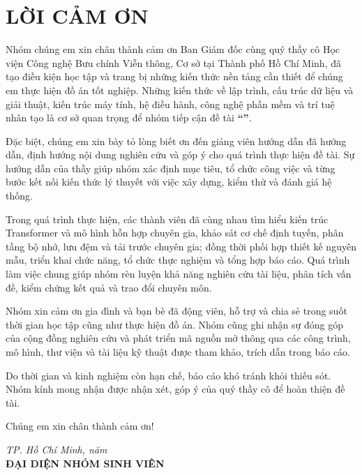 \chapter*{LỜI CẢM ƠN}

Nhóm chúng em xin chân thành cảm ơn Ban Giám đốc cùng quý thầy cô Học viện Công nghệ Bưu chính Viễn thông, Cơ sở tại Thành phố Hồ Chí Minh, đã tạo điều kiện học tập và trang bị những kiến thức nền tảng cần thiết để chúng em thực hiện đồ án tốt nghiệp. Những kiến thức về lập trình, cấu trúc dữ liệu và giải thuật, kiến trúc máy tính, hệ điều hành, công nghệ phần mềm và trí tuệ nhân tạo là cơ sở quan trọng để nhóm tiếp cận đề tài \textbf{``\reporttitle''}.

Đặc biệt, chúng em xin bày tỏ lòng biết ơn đến giảng viên hướng dẫn \textbf{\reportsupervisor} đã hướng dẫn, định hướng nội dung nghiên cứu và góp ý cho quá trình thực hiện đề tài. Sự hướng dẫn của thầy giúp nhóm xác định mục tiêu, tổ chức công việc và từng bước kết nối kiến thức lý thuyết với việc xây dựng, kiểm thử và đánh giá hệ thống.

Trong quá trình thực hiện, các thành viên đã cùng nhau tìm hiểu kiến trúc Transformer và mô hình hỗn hợp chuyên gia, khảo sát cơ chế định tuyến, phân tầng bộ nhớ, lưu đệm và tải trước chuyên gia; đồng thời phối hợp thiết kế nguyên mẫu, triển khai chức năng, tổ chức thực nghiệm và tổng hợp báo cáo. Quá trình làm việc chung giúp nhóm rèn luyện khả năng nghiên cứu tài liệu, phân tích vấn đề, kiểm chứng kết quả và trao đổi chuyên môn.

Nhóm xin cảm ơn gia đình và bạn bè đã động viên, hỗ trợ và chia sẻ trong suốt thời gian học tập cũng như thực hiện đồ án. Nhóm cũng ghi nhận sự đóng góp của cộng đồng nghiên cứu và phát triển mã nguồn mở thông qua các công trình, mô hình, thư viện và tài liệu kỹ thuật được tham khảo, trích dẫn trong báo cáo.

Do thời gian và kinh nghiệm còn hạn chế, báo cáo khó tránh khỏi thiếu sót. Nhóm kính mong nhận được nhận xét, góp ý của quý thầy cô để hoàn thiện đề tài.

Chúng em xin chân thành cảm ơn!

\vspace{0.5cm}
\begin{flushright}
\textit{TP. Hồ Chí Minh, năm \reportyear}\\[0.2cm]
\textbf{ĐẠI DIỆN NHÓM SINH VIÊN}\\[1.2cm]
\textbf{\reportrepresentative}
\end{flushright}
